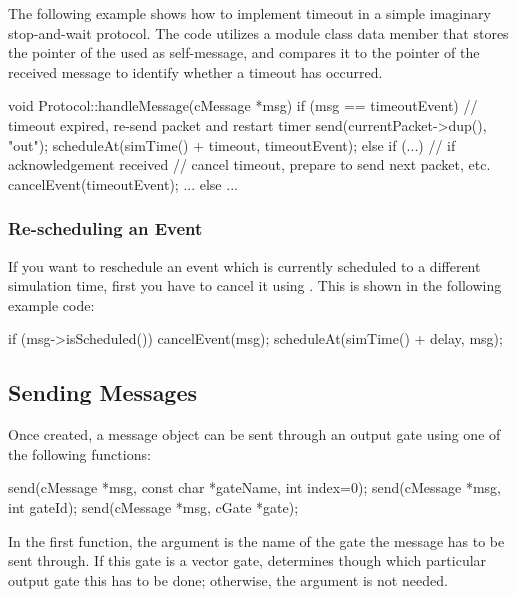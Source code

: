 The following example shows how to implement timeout in a simple
imaginary stop-and-wait protocol. The code utilizes a 
module class data member that stores the pointer of the  used
as self-message, and compares it to the pointer of the received message
to identify whether a timeout has occurred.

\begin{cpp}
void Protocol::handleMessage(cMessage *msg)
{
    if (msg == timeoutEvent) {
        // timeout expired, re-send packet and restart timer
        send(currentPacket->dup(), "out");
        scheduleAt(simTime() + timeout, timeoutEvent);
    }
    else if (...) {  // if acknowledgement received
        // cancel timeout, prepare to send next packet, etc.
        cancelEvent(timeoutEvent);
        ...
    }
    else {
       ...
    }
}
\end{cpp}


\subsubsection{Re-scheduling an Event}

If you want to reschedule an event which is currently scheduled to a different
simulation time, first you have to cancel it using .
This is shown in the following example code:

\begin{cpp}
if (msg->isScheduled())
    cancelEvent(msg);
scheduleAt(simTime() + delay, msg);
\end{cpp}


\subsection{Sending Messages}

Once created, a message object can be sent through an
output gate using one of the following functions:

\begin{cpp}
send(cMessage *msg, const char *gateName, int index=0);
send(cMessage *msg, int gateId);
send(cMessage *msg, cGate *gate);
\end{cpp}

In the first function, the argument  is the name of
the gate the message has to be sent through. If this gate is
a vector gate,  determines though which particular output
gate this has to be done; otherwise, the  argument is not
needed.

